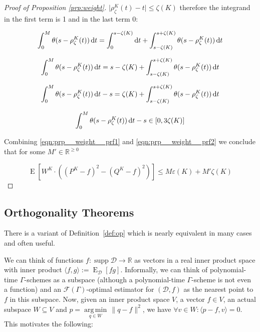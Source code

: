 \documentclass{article}
\numberwithin{equation}{section}
\theoremstyle{definition}
\theoremstyle{plain}
\DeclareMathOperator{\Supp}{supp}
\DeclareMathOperator{\E}{E}
\newcommand{\Argmin}[1]{\underset{#1}{\operatorname{arg\,min}}\,}
\newcommand{\Reals}{\mathbb{R}}
\newcommand{\Abs}[1]{\lvert #1 \rvert}
\newcommand{\Norm}[1]{\lVert #1 \rVert}
\newcommand{\Chev}[1]{\langle #1 \rangle}
\newcommand{\Dist}{\mathcal{D}}
\newcommand{\Fall}{\mathcal{F}}
\newcommand{\EG}{\Fall(\Gamma)}
\begin{document}
\begin{proof}[Proof of Proposition \ref{prp:weight}]
$\Abs{\rho_\zeta^{K}(t)-t} \leq \zeta(K)$ therefore the integrand in the first term is 1 and in the last term 0:

$$\int_0^M \theta(s-\rho_\zeta^{K}(t)) \dif t = \int_0^{s-\zeta(K)} \dif t + \int_{s-\zeta(K)}^{s+\zeta(K)} \theta(s-\rho_\zeta^{K}(t)) \dif t$$

$$\int_0^M \theta(s-\rho_\zeta^{K}(t)) \dif t = s-\zeta(K) + \int_{s-\zeta(K)}^{s+\zeta(K)} \theta(s-\rho_\zeta^{K}(t)) \dif t$$

$$\int_0^M \theta(s-\rho_\zeta^{K}(t)) \dif t - s = \zeta(K) + \int_{s-\zeta(K)}^{s+\zeta(K)} \theta(s-\rho_\zeta^{K}(t)) \dif t$$

\begin{equation}
\label{eqn:prp__weight__prf2}
\int_0^M \theta(s-\rho_\zeta^{K}(t)) \dif t - s \in [0,3\zeta(K)]
\end{equation}

Combining \ref{eqn:prp__weight__prf1} and \ref{eqn:prp__weight__prf2} we conclude that for some $M' \in \Reals^{\geq 0}$

$$\E[W^{K} \cdot ((P^{K}-f)^2-(Q^{K}-f)^2)] \leq M \varepsilon(K) + M'\zeta(K)$$
\end{proof}

\subsection{Orthogonality Theorems}

There is a variant of Definition~\ref{def:op} which is nearly equivalent in many cases and often useful.

We can think of functions $f: \Supp \Dist \rightarrow \Reals$ as vectors in a real inner product space with inner product $\Chev{f,g}:=\E_\Dist[fg]$. Informally, we can think of polynomial-time $\Gamma$-schemes as a subspace (although a polynomial-time $\Gamma$-scheme is not even a function) and an $\EG$-optimal estimator for $(\Dist,f)$ as the nearest point to $f$ in this subspace. Now, given an inner product space $V$, a vector $f \in V$, an actual subspace $W \subseteq V$ and $p = \Argmin{q \in W} \Norm{q - f}^2$, we have $\forall v \in W: \Chev{p-f,v}=0$. This motivates the following:
\end{document}
